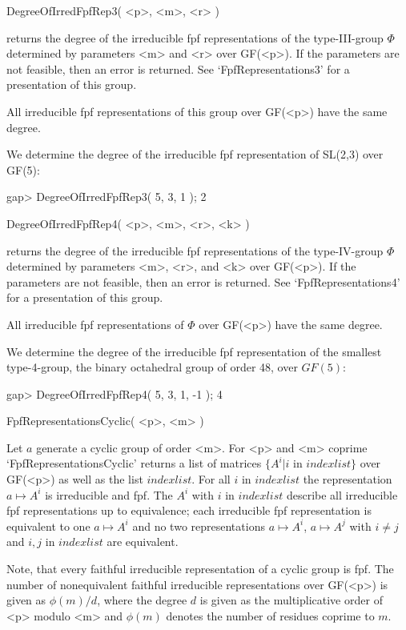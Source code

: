 \>DegreeOfIrredFpfRep3( <p>, <m>, <r> )

returns the degree of the irreducible fpf representations of
the type-III-group $\Phi$ determined by parameters <m> and <r> over
GF(<p>). If the parameters are not feasible, then an error is returned.
See `FpfRepresentations3' for a presentation of this
group.

All irreducible fpf representations of this group
over GF(<p>) have the same degree.

We determine the degree of the irreducible fpf representation of SL(2,3)
over GF(5):
 
\beginexample
    gap> DegreeOfIrredFpfRep3( 5, 3, 1 );                                  
    2
\endexample

\>DegreeOfIrredFpfRep4( <p>, <m>, <r>, <k> )

returns the degree of the irreducible fpf representations of
the type-IV-group $\Phi$ determined by parameters <m>, <r>, and <k> over
GF(<p>). If the parameters are not feasible, then an error is returned.
See `FpfRepresentations4' for a presentation of this group.

All irreducible fpf representations of $\Phi$ over GF(<p>) have
the same degree.

We determine the degree of the irreducible fpf representation of the smallest
type-4-group, the binary octahedral group of order 48, over $GF(5)$:
 
\beginexample
    gap> DegreeOfIrredFpfRep4( 5, 3, 1, -1 );   
    4
\endexample
 
\>FpfRepresentationsCyclic( <p>, <m> )

Let $a$ generate a cyclic group of order <m>. 
For <p> and <m> coprime `FpfRepresentationsCyclic'
returns a list of matrices $\{ A^i | i$ in $indexlist \}$ over GF(<p>)
as well as the list $indexlist$.
For all $i$ in $indexlist$ the representation $a \mapsto A^i$  
is irreducible and fpf.
The $A^i$ with $i$ in $indexlist$ describe all irreducible fpf
representations up to equivalence; each irreducible fpf
representation is equivalent to one $a \mapsto A^i$ and no two representations
$a \mapsto A^i$, $a \mapsto A^j$ with $i\neq j$ and $i,j$ in $indexlist$ are
equivalent.

Note, that every faithful irreducible representation of a cyclic group 
is fpf. The number of nonequivalent faithful irreducible
representations over GF(<p>) is given as $\phi(m)/d$, where the degree $d$ is
given as the multiplicative order of <p> modulo <m> and $\phi(m)$ denotes
the number of residues coprime to $m$.

